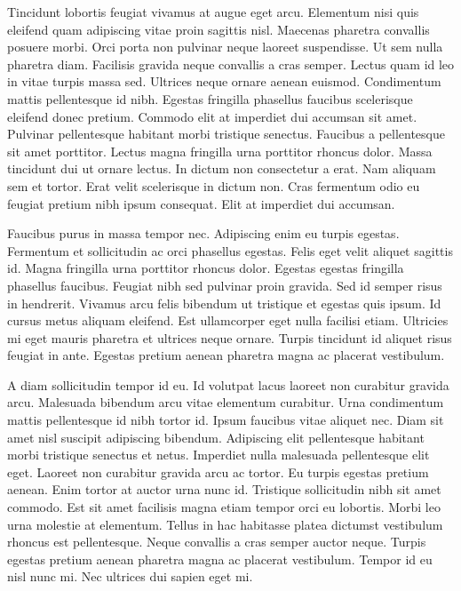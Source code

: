 \documentclass[11pt,a4paper]{article}
\begin{document}
Tincidunt lobortis feugiat vivamus at augue eget arcu. Elementum nisi quis eleifend quam adipiscing vitae proin sagittis nisl. Maecenas pharetra convallis posuere morbi. Orci porta non pulvinar neque laoreet suspendisse. Ut sem nulla pharetra diam. Facilisis gravida neque convallis a cras semper. Lectus quam id leo in vitae turpis massa sed. Ultrices neque ornare aenean euismod. Condimentum mattis pellentesque id nibh. Egestas fringilla phasellus faucibus scelerisque eleifend donec pretium. Commodo elit at imperdiet dui accumsan sit amet. Pulvinar pellentesque habitant morbi tristique senectus. Faucibus a pellentesque sit amet porttitor. Lectus magna fringilla urna porttitor rhoncus dolor. Massa tincidunt dui ut ornare lectus. In dictum non consectetur a erat. Nam aliquam sem et tortor. Erat velit scelerisque in dictum non. Cras fermentum odio eu feugiat pretium nibh ipsum consequat. Elit at imperdiet dui accumsan.

Faucibus purus in massa tempor nec. Adipiscing enim eu turpis egestas. Fermentum et sollicitudin ac orci phasellus egestas. Felis eget velit aliquet sagittis id. Magna fringilla urna porttitor rhoncus dolor. Egestas egestas fringilla phasellus faucibus. Feugiat nibh sed pulvinar proin gravida. Sed id semper risus in hendrerit. Vivamus arcu felis bibendum ut tristique et egestas quis ipsum. Id cursus metus aliquam eleifend. Est ullamcorper eget nulla facilisi etiam. Ultricies mi eget mauris pharetra et ultrices neque ornare. Turpis tincidunt id aliquet risus feugiat in ante. Egestas pretium aenean pharetra magna ac placerat vestibulum.

A diam sollicitudin tempor id eu. Id volutpat lacus laoreet non curabitur gravida arcu. Malesuada bibendum arcu vitae elementum curabitur. Urna condimentum mattis pellentesque id nibh tortor id. Ipsum faucibus vitae aliquet nec. Diam sit amet nisl suscipit adipiscing bibendum. Adipiscing elit pellentesque habitant morbi tristique senectus et netus. Imperdiet nulla malesuada pellentesque elit eget. Laoreet non curabitur gravida arcu ac tortor. Eu turpis egestas pretium aenean. Enim tortor at auctor urna nunc id. Tristique sollicitudin nibh sit amet commodo. Est sit amet facilisis magna etiam tempor orci eu lobortis. Morbi leo urna molestie at elementum. Tellus in hac habitasse platea dictumst vestibulum rhoncus est pellentesque. Neque convallis a cras semper auctor neque. Turpis egestas pretium aenean pharetra magna ac placerat vestibulum. Tempor id eu nisl nunc mi. Nec ultrices dui sapien eget mi.
\end{document}
